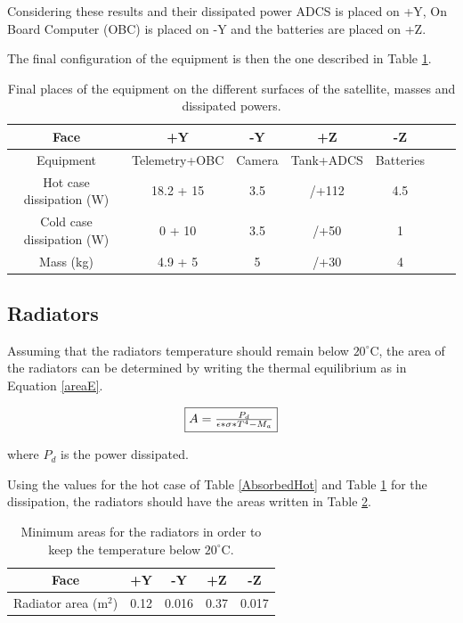 \documentclass[a4paper, oneside, 11pt]{article}
\begin{document}
Considering these results and their dissipated power ADCS is placed on +Y, On Board Computer (OBC) is placed on -Y and the batteries are placed on +Z. 

The final configuration of the equipment is then the one described in Table \ref{finalPlaces}.



\begin{table}[!h]
 \caption{Final places of the equipment on the different surfaces of the satellite, masses and dissipated powers.}
 \label{finalPlaces}
\centering \begin{tabular}{| c | c |c |c |c |c |c |}
  \hline
Face & +Y & -Y & +Z & -Z\\
   \hline
 Equipment  & Telemetry+OBC & Camera &  Tank+ADCS  & Batteries\\
     \hline
 Hot case dissipation (W)  & 18.2 + 15 &  3.5 & /+112 & 4.5  \\
     \hline
Cold case dissipation (W)  & 0 + 10 & 3.5 & /+50 & 1  \\
     \hline
Mass (kg)  & 4.9 + 5 & 5 & /+30 & 4  \\
     \hline
\end{tabular}
\end{table}

\subsection{Radiators}

Assuming that the radiators temperature should remain below $20^{\circ}$C, the area of the radiators can be determined by writing the thermal equilibrium as in Equation \ref{areaE}.

\begin{equation}
\fbox{$A=\frac{P_d}{\epsilon*\sigma*T^4-M_a}$}
\label{areaE}
\end{equation}

where $P_d$ is the power dissipated.

Using the values for the hot case of Table \ref{AbsorbedHot} and Table \ref{finalPlaces} for the dissipation, the radiators should have the areas written in Table \ref{areaT}.

\begin{table}[!h]
 \caption{Minimum areas for the radiators in order to keep the temperature below $20^{\circ}$C.}
 \label{areaT}
\centering \begin{tabular}{| c | c |c |c |c |}
  \hline
Face & +Y &  -Y  & +Z & -Z  \\   
   \hline
 Radiator area ($\text{m}^\text{2}$) & 0.12 & 0.016  & 0.37 &  0.017 \\
     \hline
\end{tabular}
\end{table}
\end{document}
